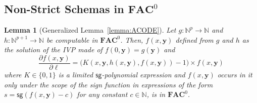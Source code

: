 \documentclass[11pt, oneside]{article}
\newcommand{\fun}[1]{\mathsf{#1}}
\newcommand{\Nat}{\mathbb{N}}
\newcommand{\AC}{\mathbf{FAC}}
\newcommand{\tu}[1]{\mathbf{#1}}
\newtheorem{lemma}{Lemma}
\theoremstyle{definition}
\begin{document}
\begin{toappendix}
\subsection{Non-Strict Schemas in $\AC^0$}\label{appendix:strictAC0}
%
%


\begin{lemma}[Generalized Lemma~\ref{lemma:ACODE}]\label{lemma:ACODEg}
    Let $g:\Nat^p\to \Nat$ and $h:\Nat^{p+1} \to \Nat$ be computable in $\AC^0$.
    Then, $f(x, \tu y)$ defined from $g$ and $h$ as the solution of the IVP made of $f(0, \tu y)=g(\tu y)$ and 
    $$
        \frac{\partial f(x, \tu y)}{\partial \ell} = \big(K(x, \tu y, h(x, \tu y), f(x, \tu y))-1\big) \times f(x, \tu y)
    $$
    where $K\in \{0,1\}$ is a limited $\fun{sg}$-polynomial expression and $f(x, \tu y)$ occurs in it only under the scope of the sign function in expressions of the form $s=\fun{sg}(f(x, \tu y)-c)$ for any constant $c\in \Nat$, is in $\AC^0$.
\end{lemma}


\end{toappendix}
\end{document}
